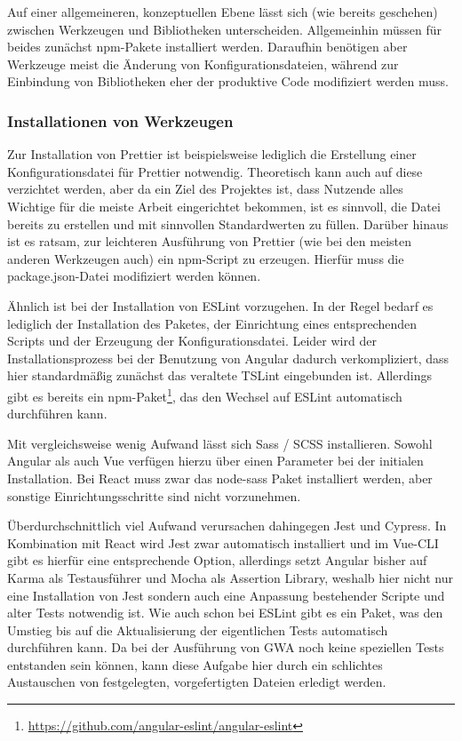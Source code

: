 Auf einer allgemeineren, konzeptuellen Ebene lässt sich (wie bereits geschehen) zwischen Werkzeugen und Bibliotheken unterscheiden. Allgemeinhin müssen für beides zunächst \gls{npm}-Pakete installiert werden. Daraufhin benötigen aber Werkzeuge meist die Änderung von Konfigurationsdateien, während zur Einbindung von Bibliotheken eher der produktive Code modifiziert werden muss.

\subsubsection{Installationen von Werkzeugen}
Zur Installation von Prettier ist beispielsweise lediglich die Erstellung einer Konfigurationsdatei für Prettier notwendig. Theoretisch kann auch auf diese verzichtet werden, aber da ein Ziel des Projektes ist, dass Nutzende alles Wichtige für die meiste Arbeit eingerichtet bekommen, ist es sinnvoll, die Datei bereits zu erstellen und mit sinnvollen Standardwerten zu füllen. Darüber hinaus ist es ratsam, zur leichteren Ausführung von Prettier (wie bei den meisten anderen Werkzeugen auch) ein \gls{npm}-Script zu erzeugen. Hierfür muss die package.json-Datei modifiziert werden können.

Ähnlich ist bei der Installation von ESLint vorzugehen. In der Regel bedarf es lediglich der Installation des Paketes, der Einrichtung eines entsprechenden Scripts und der Erzeugung der Konfigurationsdatei. Leider wird der Installationsprozess bei der Benutzung von Angular dadurch verkompliziert, dass hier standardmäßig zunächst das veraltete TSLint eingebunden ist. Allerdings gibt es bereits ein \gls{npm}-Paket\footnote{\url{https://github.com/angular-eslint/angular-eslint}}, das den Wechsel auf ESLint automatisch durchführen kann.

Mit vergleichsweise wenig Aufwand lässt sich Sass / SCSS installieren. Sowohl Angular als auch Vue verfügen hierzu über einen Parameter bei der initialen Installation. Bei React muss zwar das node-sass Paket installiert werden, aber sonstige Einrichtungsschritte sind nicht vorzunehmen.

Überdurchschnittlich viel Aufwand verursachen dahingegen Jest und Cypress. In Kombination mit React wird Jest zwar automatisch installiert und im Vue-\gls{CLI} gibt es hierfür eine entsprechende Option, allerdings setzt Angular bisher auf Karma als Testausführer und Mocha als Assertion Library, weshalb hier nicht nur eine Installation von Jest sondern auch eine Anpassung bestehender Scripte und alter Tests notwendig ist. Wie auch schon bei ESLint gibt es ein Paket, was den Umstieg bis auf die Aktualisierung der eigentlichen Tests automatisch durchführen kann. Da bei der Ausführung von \gls{GWA} noch keine speziellen Tests entstanden sein können, kann diese Aufgabe hier durch ein schlichtes Austauschen von festgelegten, vorgefertigten Dateien erledigt werden.

